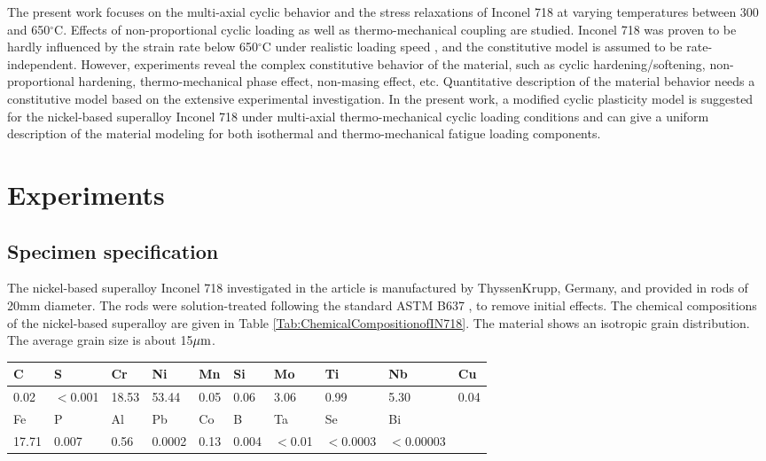 \documentclass[preprint,5p,twocolumn,11pt,sort&compress]{elsarticle}
\begin{document}
The present work focuses on the multi-axial cyclic behavior and the stress relaxations of Inconel 718 at varying temperatures between 300 and 650$^{\circ}$C. Effects of non-proportional cyclic loading as well as thermo-mechanical coupling are studied. Inconel 718 was proven to be hardly influenced by the strain rate below 650$^{\circ}$C under realistic loading speed \cite{kim1988elevated, Schlesinger2017}, and the constitutive model is assumed to be rate-independent. However,  experiments reveal the complex constitutive behavior of the material, such as cyclic hardening/softening, non-proportional hardening, thermo-mechanical phase effect, non-masing effect, etc. Quantitative description of the material behavior needs a constitutive model based on the extensive experimental investigation. In the present work, a modified cyclic plasticity model is suggested for the nickel-based superalloy Inconel 718 under multi-axial thermo-mechanical cyclic loading conditions and can give a uniform description of the material modeling for both isothermal and thermo-mechanical fatigue loading components.

\section{Experiments}

\subsection{Specimen specification}
\noindent The nickel-based superalloy Inconel 718 investigated in the article is manufactured by ThyssenKrupp, Germany, and provided in rods of 20mm diameter. The rods were solution-treated following the standard ASTM B637 \cite{ASTMB63716}, to remove initial effects.
The chemical compositions of the nickel-based superalloy are given in Table \ref{Tab:ChemicalCompositionofIN718}. The material shows an isotropic grain distribution. The average grain size is about 15$\rm{\mu m}$.

\begin{table*}[htbp]
  \centering
  \caption{Chemical composition of the investigated material Inconel 718 (wt. \%).}
    \begin{tabular}{llllllllll}
    \hline
    C     & S     & Cr    & Ni    & Mn    & Si    & Mo    & Ti    & Nb    & Cu \\
    \hline
    0.02  & $<$0.001 & 18.53 & 53.44 & 0.05  & 0.06  & 3.06  & 0.99  & 5.30  & 0.04 \\
    \hline
    Fe    & P     & Al    & Pb    & Co    & B     & Ta    & Se    & Bi    &  \\
    \hline
    17.71 & 0.007 & 0.56  & 0.0002 & 0.13  & 0.004 & $<$0.01 & $<$0.0003 & $<$0.00003 &  \\
    \hline
    \end{tabular}%
  \label{Tab:ChemicalCompositionofIN718}%
\end{table*}%
\end{document}
